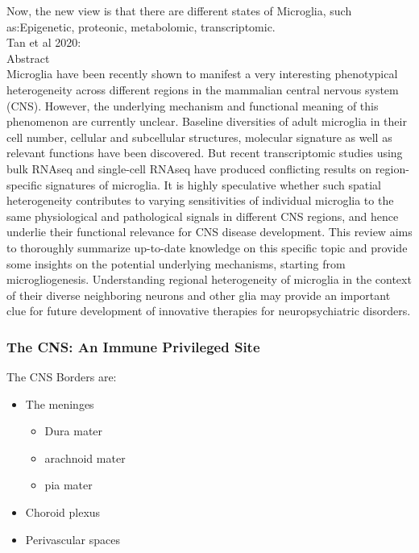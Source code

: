 \begin{itemize}
\begin{itemize}
\begin{itemize}
\end{itemize}
Now, the new view is that there are different states of Microglia, such as:Epigenetic, proteonic, metabolomic, transcriptomic.
\\Tan et al 2020:
\\Abstract
\\Microglia have been recently shown to manifest a very interesting phenotypical heterogeneity across different regions in the mammalian central nervous system (CNS). However, the underlying mechanism and functional meaning of this phenomenon are currently unclear. Baseline diversities of adult microglia in their cell number, cellular and subcellular structures, molecular signature as well as relevant functions have been discovered. But recent transcriptomic studies using bulk RNAseq and single-cell RNAseq have produced conflicting results on region-specific signatures of microglia. It is highly speculative whether such spatial heterogeneity contributes to varying sensitivities of individual microglia to the same physiological and pathological signals in different CNS regions, and hence underlie their functional relevance for CNS disease development. This review aims to thoroughly summarize up-to-date knowledge on this specific topic and provide some insights on the potential underlying mechanisms, starting from microgliogenesis. Understanding regional heterogeneity of microglia in the context of their diverse neighboring neurons and other glia may provide an important clue for future development of innovative therapies for neuropsychiatric disorders.




\subsubsection{The CNS: An Immune Privileged Site}
The CNS Borders are:
\begin{itemize}
    \item The meninges
    \begin{itemize}
        \item Dura mater 
        \item arachnoid mater
        \item pia mater
    
    \end{itemize}
    \item Choroid plexus
    \item Perivascular spaces
\end{itemize}


\end{itemize}
\end{itemize}
